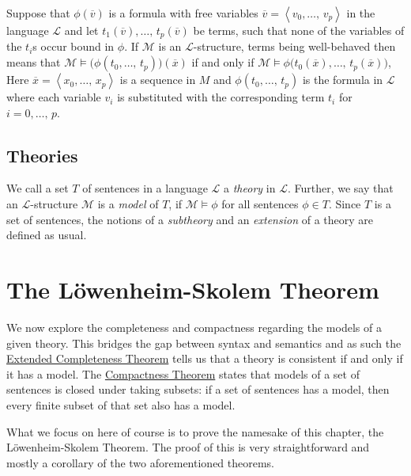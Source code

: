 \documentclass[../../main.tex]{subfiles}
\begin{document}
Suppose that $\phi(\overline{v})$ is a formula with free variables $\overline{v} = \left<v_0,\ldots,\, v_p\right>$ in the language $\mathcal{L}$ and let $t_1(\overline{v}),\ldots,\, t_p(\overline{v})$ be terms, 
such that none of the variables of the $t_i$s occur bound in $\phi$.
If $\mathcal{M}$ is an $\mathcal{L}$-structure,
terms being well-behaved then means that $\mathcal{M} \models \big(\phi(t_0,\ldots,\, t_p)\big)(\overline{x})$ if and only if $\mathcal{M} \models  \phi\big(t_0(\overline{x}) ,\ldots,\, t_p(\overline{x})\big)$,
Here $\overline{x} = \left<x_0,\ldots,\, x_p\right>$ is a sequence in $M$ and $\phi(t_0,\ldots,\, t_p)$ is the formula in $\mathcal{L}$ where each variable $v_i$ is substituted with the corresponding term $t_i$ for $i = 0,\ldots,\, p$.

\subsection{Theories}
\begin{definition}[Theory]\cite[\S.1.2]{Mar02}\cite[\S 1.4]{Cha90}
    We call a set $T$ of sentences in a language $\mathcal{L}$ a \emph{theory} in $\mathcal{L}$.
    Further, we say that an $\mathcal{L}$-structure $\mathcal{M}$ is a \emph{model} of $T$,
    if $\mathcal{M} \models \phi$ for all sentences $\phi \in T$.
    Since $T$ is a set of sentences, the notions of a \emph{subtheory} and an \emph{extension} of a theory are defined as usual.
\end{definition}

\section{The Löwenheim-Skolem Theorem}

We now explore the completeness and compactness regarding the models of a given theory.
This bridges the gap between syntax and semantics and as such
the \hyperref[completeness-thm]{Extended Completeness Theorem} tells us that a theory is consistent if and only if it has a model.
The \hyperref[compactness-thm]{Compactness Theorem} states that models of a set of sentences is closed under taking subsets:
if a set of sentences has a model, then every finite subset of that set also has a model.

What we focus on here of course is to prove the namesake of this chapter, the Löwenheim-Skolem Theorem.
The proof of this is very straightforward and mostly a corollary of the two aforementioned theorems.
\end{document}

